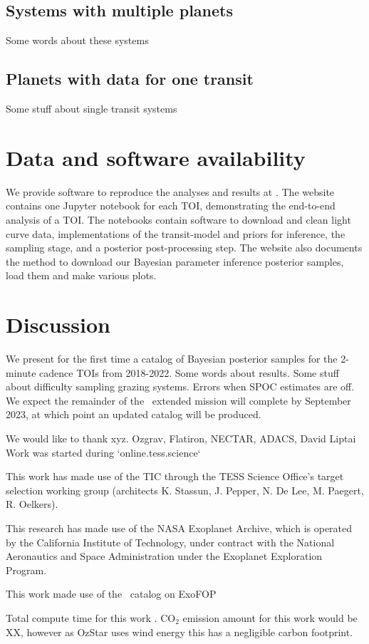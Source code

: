 \documentclass[floatfix,ApJL,twocolumn]{aastex631}
\begin{document}
\subsection{Systems with multiple planets}
Some words about these systems

\subsection{Planets with data for one transit}
Some stuff about single transit systems 


\section{Data and software availability}\label{sec:data}
We provide software to reproduce the analyses and results at \atlasUrl. 
The website contains one Jupyter notebook for each TOI, demonstrating the end-to-end analysis of a TOI. 
The notebooks contain software to download and clean light curve data, implementations of the transit-model and priors for inference, the \pymc sampling stage, and a posterior post-processing step.
The website also documents the method to download our Bayesian parameter inference posterior samples, load them and make various plots.  

\section{Discussion}\label{sec:conclusion}
We present for the first time a catalog of Bayesian posterior samples for the 2-minute cadence TOIs from 2018-2022. 
Some words about results. 
Some stuff about difficulty sampling grazing systems.
Errors when SPOC estimates are off. 
We expect the remainder of the \tess\ extended mission will complete by September 2023, at which point an updated catalog will be produced.

\begin{acknowledgments}

We would like to thank xyz. 
Ozgrav, Flatiron, NECTAR, ADACS, David Liptai
Work was started during `online.tess.science`

This work has made use of the TIC through the TESS Science Office’s target selection working group (architects K. Stassun, J. Pepper, N. De Lee, M. Paegert, R. Oelkers).

This research has made use of the NASA Exoplanet Archive, which is operated by the California Institute of Technology, under contract with the National Aeronautics and Space Administration under the Exoplanet Exploration Program.

This work made use of the \tess\ catalog on ExoFOP

Total compute time for this work \red{\cpuHrs} . CO$_2$ emission amount for this work would be XX, however as OzStar uses wind energy this has a negligible carbon footprint. 

\end{acknowledgments}
\end{document}
